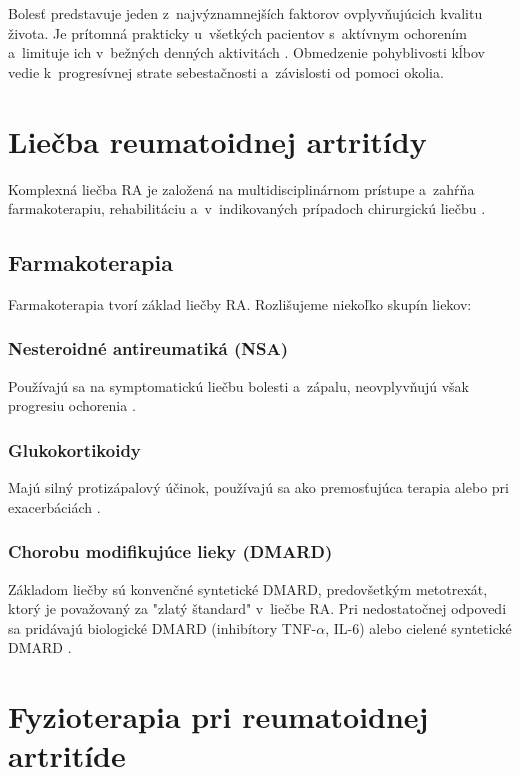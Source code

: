 Bolesť predstavuje jeden z~najvýznamnejších faktorov ovplyvňujúcich kvalitu života. Je prítomná prakticky u~všetkých pacientov s~aktívnym ochorením a~limituje ich v~bežných denných aktivitách \parencite{Herbert2022}. Obmedzenie pohyblivosti kĺbov vedie k~progresívnej strate sebestačnosti a~závislosti od pomoci okolia.

\section{Liečba reumatoidnej artritídy}

Komplexná liečba RA je založená na multidisciplinárnom prístupe a~zahŕňa farmakoterapiu, rehabilitáciu a~v~indikovaných prípadoch chirurgickú liečbu \parencite{pavelka2018}.

\subsection{Farmakoterapia}

Farmakoterapia tvorí základ liečby RA. Rozlišujeme niekoľko skupín liekov:

\subsubsection{Nesteroidné antireumatiká (NSA)}
Používajú sa na symptomatickú liečbu bolesti a~zápalu, neovplyvňujú však progresiu ochorenia \parencite{Macejova2019}.

\subsubsection{Glukokortikoidy}
Majú silný protizápalový účinok, používajú sa ako premosťujúca terapia alebo pri exacerbáciách \parencite{firestein2021}.

\subsubsection{Chorobu modifikujúce lieky (DMARD)}
Základom liečby sú konvenčné syntetické DMARD, predovšetkým metotrexát, ktorý je považovaný za "zlatý štandard" v~liečbe RA. Pri nedostatočnej odpovedi sa pridávajú biologické DMARD (inhibítory TNF-$\alpha$, IL-6) alebo cielené syntetické DMARD \parencite{smolen2018}.

\section{Fyzioterapia pri reumatoidnej artritíde}

